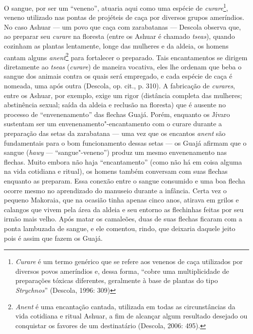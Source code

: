 O sangue, por ser um ``veneno'', atuaria aqui como uma espécie de
\emph{curare}\footnote{\emph{Curare} é um termo genérico que se refere
  aos venenos de caça utilizados por diversos povos ameríndios e, dessa
  forma, ``cobre uma multiplicidade de preparações tóxicas diferentes,
      geralmente à base de plantas do tipo \emph{Strychnos}'' (Descola, 1996:
  309)}, veneno utilizado nas pontas de projéteis de caça por diversos
grupos ameríndios. No caso Ashuar --- um povo que caça com zarabatanas ---
Descola observa que, ao preparar seu \emph{curare} na floresta (entre os
Ashuar é chamado \emph{tseas}), quando cozinham as plantas lentamente,
longe das mulheres e da aldeia, os homens cantam alguns
\emph{anent}\footnote{\emph{Anent} é uma encantação cantada, utilizada
  em todas as circunstâncias da vida cotidiana e ritual Ashuar, a fim de
  alcançar algum resultado desejado ou conquistar os favores de um
  destinatário (Descola, 2006: 495).} para fortalecer o preparado. Tais
encantamentos se dirigem diretamente ao \emph{tseas} (\emph{curare}) de
maneira vocativa, eles lhe ordenam que beba o sangue dos animais contra
os quais será empregado, e cada espécie de caça é nomeada, uma após
outra (Descola, op. cit., p. 310). A fabricação de \emph{curares}, entre
os Ashuar, por exemplo, exige um rigor (distância completa das mulheres;
abstinência sexual; saída da aldeia e reclusão na floresta) que é
ausente no processo de ``envenenamento'' das flechas Guajá. Porém,
enquanto os Jívaro sustentam ser um envenenamento"-encantamento com o
curare durante a preparação das setas da zarabatana --- uma vez que os
encantos \emph{anent} são fundamentais para o bom funcionamento dessas
setas --- os Guajá afirmam que o sangue (\emph{hawy} --- ``sangue"-veneno'')
produz um mesmo envenenamento nas flechas. Muito embora não haja
``encantamento'' (como não há em coisa alguma na vida cotidiana e ritual),
os homens também conversam com suas flechas enquanto as preparam. Essa
conexão entre o sangue consumido e uma boa flecha ocorre mesmo no
aprendizado do manuseio durante a infância. Certa vez o pequeno
Makoraia, que na ocasião tinha apenas cinco anos, atirava em grilos e
calangos que vivem pela área da aldeia e seu entorno as flechinhas
feitas por seu irmão mais velho. Após matar os camaleões, duas de suas
flechas ficaram com a ponta lambuzada de sangue, e ele comentou, rindo,
que deixaria daquele jeito pois é assim que fazem os Guajá.


